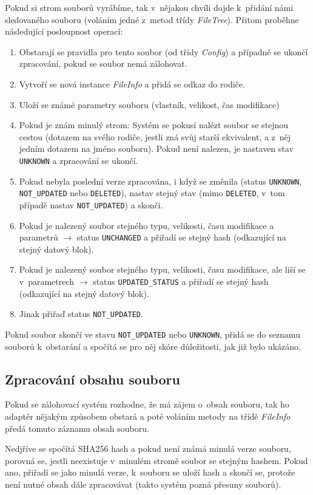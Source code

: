 Pokud si strom souborů vyrábíme, tak v~nějakou chvíli dojde k~přidání námi
sledovaného souboru (voláním jedné z~metod třídy {\it FileTree}). Přitom proběhne
následující posloupnost operací:
\begin{enumerate}
	\item Obstarají se pravidla pro tento soubor (od třídy {\it Config})
	a případně se ukončí zpracování, pokud se soubor nemá zálohovat.
	\item Vytvoří se nová instance {\it FileInfo} a přidá se odkaz do rodiče.
	\item Uloží se známé parametry souboru (vlastník, velikost, čas modifikace)
	\item Pokud je znám minulý strom: Systém se pokusí nalézt soubor se
	stejnou cestou (dotazem na svého rodiče, jestli zná svůj starší
	ekvivalent, a z~něj jedním dotazem na jméno souboru). Pokud není nalezen,
	je nastaven stav \texttt{UNKNOWN} a zpracování se ukončí.
	\item Pokud nebyla poslední verze zpracována, i když se změnila (status
	\texttt{UNKNOWN}, \texttt{NOT\_UPDATED} nebo \texttt{DELETED}), nastav
	stejný stav (mimo \texttt{DELETED}, v~tom případě nastav
	\texttt{NOT\_UPDATED}) a skonči.
	\item Pokud je nalezený soubor stejného typu, velikosti, času modifikace
	a parametrů $\rightarrow$ status \texttt{UNCHANGED} a přiřadí se stejný hash
	(odkazující na stejný datový blok).
	\item Pokud je nalezený soubor stejného typu, velikosti, času modifikace,
	ale liší se v~parametrech $\rightarrow$ status \texttt{UPDATED\_STATUS}
	a přiřadí se stejný hash (odkazující na stejný datový blok).
	\item Jinak přiřaď status \texttt{NOT\_UPDATED}.
\end{enumerate}

Pokud soubor skončí ve stavu \texttt{NOT\_UPDATED} nebo \texttt{UNKNOWN}, přidá
se do seznamu souborů k~obstarání a spočítá se pro něj skóre důležitosti, jak
již bylo ukázáno.

\subsection{Zpracování obsahu souboru}

Pokud se zálohovací systém rozhodne, že má zájem o~obsah souboru, tak ho adaptér
nějakým způsobem obstará a poté voláním metody na třídě {\it FileInfo} předá
tomuto záznamu obsah souboru.

Nedjříve se spočítá \gls{SHA256} hash a pokud není známá minulá verze souboru,
porovná se, jestli neexistuje v~minulém stromě soubor se stejným hashem. Pokud
ano, přiřadí se jako minulá verze, k~souboru se uloží hash a skončí se, protože
není nutné obsah dále zpracovávat (takto systém pozná přesuny souborů).

